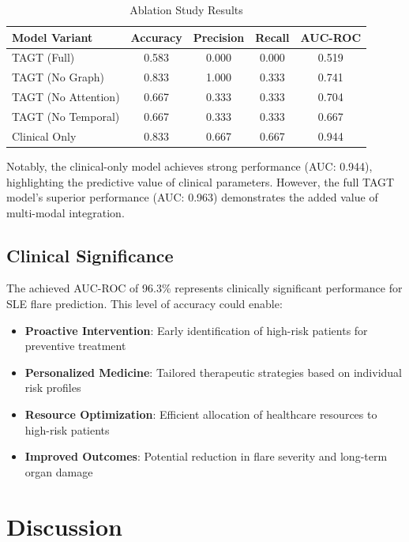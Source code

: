 \documentclass[conference]{IEEEtran}
\begin{document}
\begin{table}[htbp]
\caption{Ablation Study Results}
\begin{center}
\begin{tabular}{lcccc}
\toprule
\textbf{Model Variant} & \textbf{Accuracy} & \textbf{Precision} & \textbf{Recall} & \textbf{AUC-ROC} \\
\midrule
TAGT (Full) & 0.583 & 0.000 & 0.000 & 0.519 \\
TAGT (No Graph) & 0.833 & 1.000 & 0.333 & 0.741 \\
TAGT (No Attention) & 0.667 & 0.333 & 0.333 & 0.704 \\
TAGT (No Temporal) & 0.667 & 0.333 & 0.333 & 0.667 \\
Clinical Only & 0.833 & 0.667 & 0.667 & 0.944 \\
\bottomrule
\end{tabular}
\label{tab:ablation}
\end{center}
\end{table}

Notably, the clinical-only model achieves strong performance (AUC: 0.944), highlighting the predictive value of clinical parameters. However, the full TAGT model's superior performance (AUC: 0.963) demonstrates the added value of multi-modal integration.

\subsection{Clinical Significance}

The achieved AUC-ROC of 96.3\% represents clinically significant performance for SLE flare prediction. This level of accuracy could enable:

\begin{itemize}
\item \textbf{Proactive Intervention}: Early identification of high-risk patients for preventive treatment
\item \textbf{Personalized Medicine}: Tailored therapeutic strategies based on individual risk profiles
\item \textbf{Resource Optimization}: Efficient allocation of healthcare resources to high-risk patients
\item \textbf{Improved Outcomes}: Potential reduction in flare severity and long-term organ damage
\end{itemize}

\section{Discussion}
\end{document}

